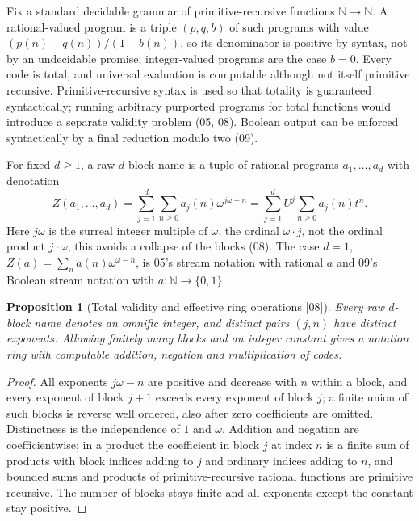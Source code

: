 \documentclass[11pt,oneside]{article}
\numberwithin{equation}{section}
\newtheorem{proposition}[proposition]{Proposition}
\theoremstyle{definition}
\theoremstyle{remark}
\newcommand{\N}{\mathbb N}
\newcommand{\src}[1]{\textup{\textsf{\small[#1]}}}
\begin{document}
Fix a standard decidable grammar of primitive-recursive functions $\N\to\N$. A
rational-valued program is a triple $(p,q,b)$ of such programs with value
$(p(n)-q(n))/(1+b(n))$, so its denominator is positive by syntax, not by an
undecidable promise; integer-valued programs are the case $b=0$. Every code is
total, and universal evaluation is computable although not itself primitive
recursive. Primitive-recursive syntax is used so that totality is guaranteed
syntactically; running arbitrary purported programs for total functions would
introduce a separate validity problem (05, 08). Boolean output can be enforced
syntactically by a final reduction modulo two (09).

For fixed $d\ge1$, a raw $d$-block name is a tuple of rational programs
$a_1,\ldots,a_d$ with denotation
\begin{equation}\label{onot:neg:eq:raw}
 Z(a_1,\ldots,a_d)=\sum_{j=1}^d\sum_{n\ge0}a_j(n)\omega^{j\omega-n}=\sum_{j=1}^dU^j\sum_{n\ge0}a_j(n)t^n.
\end{equation}
Here $j\omega$ is the surreal integer multiple of $\omega$, the ordinal
$\omega\cdot j$, not the ordinal product $j\cdot\omega$; this avoids a collapse of
the blocks (08). The case $d=1$, $Z(a)=\sum_na(n)\omega^{\omega-n}$, is 05's stream
notation with rational $a$ and 09's Boolean stream notation with $a:\N\to\{0,1\}$.

\begin{proposition}[Total validity and effective ring operations \src{08}]\label{onot:neg:prop:rawvalid}
Every raw $d$-block name denotes an omnific integer, and distinct pairs $(j,n)$
have distinct exponents. Allowing finitely many blocks and an integer constant
gives a notation ring with computable addition, negation and multiplication of
codes.
\end{proposition}
\begin{proof}
All exponents $j\omega-n$ are positive and decrease with $n$ within a block, and
every exponent of block $j+1$ exceeds every exponent of block $j$; a finite union
of such blocks is reverse well ordered, also after zero coefficients are
omitted. Distinctness is the independence of $1$ and $\omega$. Addition and
negation are coefficientwise; in a product the coefficient in block $j$ at index
$n$ is a finite sum of products with block indices adding to $j$ and ordinary
indices adding to $n$, and bounded sums and products of primitive-recursive
rational functions are primitive recursive. The number of blocks stays finite and
all exponents except the constant stay positive.
\end{proof}
\end{document}
